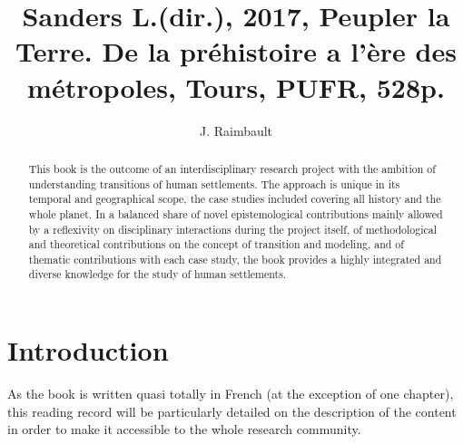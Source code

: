 \documentclass[11pt]{article}
\begin{document}
\title{Sanders L.(dir.), 2017, Peupler la Terre. De la pr{\'e}histoire a l'{\`e}re des m{\'e}tropoles, Tours, PUFR,  528p.}

\author{J. Raimbault}

\date{}

\maketitle

\begin{abstract}
	This book is the outcome of an interdisciplinary research project with the ambition of understanding transitions of human settlements. The approach is unique in its temporal and geographical scope, the case studies included covering all history and the whole planet. In a balanced share of novel epistemological contributions mainly allowed by a reflexivity on disciplinary interactions during the project itself, of methodological and theoretical contributions on the concept of transition and modeling, and of thematic contributions with each case study, the book provides a highly integrated and diverse knowledge for the study of human settlements.
\end{abstract}


\section*{Introduction}



As the book is written quasi totally in French (at the exception of one chapter), this reading record will be particularly detailed on the description of the content in order to make it accessible to the whole research community.





	
	
\end{document}
